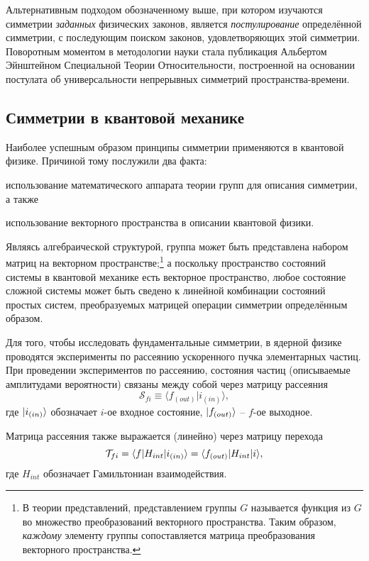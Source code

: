 \documentclass[14pt]{extarticle}
\newcommand{\SMatrix}{\mathcal{S}}
\newcommand{\TMatrix}{\mathcal{T}}
\newcommand{\ampl}[2]{\langle #1 \vert #2 \rangle}
\begin{document}
Альтернативным подходом обозначенному выше, при котором изучаются симметрии \emph{заданных} физических законов, является \emph{постулирование} определённой симметрии, с последующим поиском законов, удовлетворяющих этой симметрии. Поворотным моментом в методологии науки стала публикация Альбертом Эйнштейном Специальной Теории Относительности, построенной на основании постулата об универсальности непрерывных симметрий пространства-времени.~\cite{SEP.Symmetry}

\subsection{Симметрии в квантовой механике}

Наиболее успешным образом принципы симметрии применяются в квантовой физике. Причиной тому послужили два факта: 
\begin{inparaenum}[(1)]
	\item использование математического аппарата теории групп для описания симметрии, а также
	\item использование векторного пространства в описании квантовой физики.
\end{inparaenum}

Являясь алгебраической структурой, группа может быть представлена набором матриц на векторном пространстве;\footnote{В теории представлений, представлением группы $G$ называется функция из $G$ во множество преобразований векторного пространства. Таким образом, \emph{каждому} элементу группы сопоставляется матрица преобразования векторного пространства.} а поскольку пространство состояний системы в квантовой механике есть векторное пространство, любое состояние сложной системы может быть сведено к линейной комбинации состояний простых систем, преобразуемых матрицей операции симметрии определённым образом.

Для того, чтобы исследовать фундаментальные симметрии, в ядерной физике проводятся эксперименты по рассеянию ускоренного пучка элементарных частиц. При проведении экспериментов по рассеянию, состояния частиц (описываемые амплитудами вероятности) связаны между собой через матрицу рассеяния~\cite{Symmetries}
\[
\SMatrix_{fi} \equiv \ampl{f_{(out)}}{i_{(in)}},
\]
где $\vert{i_{(in)}}\rangle$ обозначает $i$-ое входное состояние, $\vert{f_{(out)}}\rangle$ -- $f$-ое выходное.

Матрица рассеяния также выражается (линейно) через матрицу перехода 
\[
\TMatrix_{fi} = \bra{f}H_{int}\ket{i_{(in)}} = \bra{f_{(out)}}H_{int}\ket{i},
\]
где $H_{int}$ обозначает Гамильтониан взаимодействия.
\end{document}
